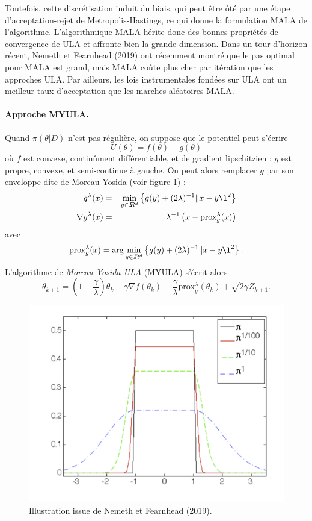 Toutefois, cette discrétisation induit du biais, qui peut être ôté par une étape d'acceptation-rejet de Metropolis-Hastings, ce qui donne la formulation MALA de l'algorithme. L'algorithmique MALA hérite donc des bonnes propriétés de convergence de ULA et affronte bien la grande dimension. Dans un tour d'horizon récent, Nemeth et Fearnhead (2019) ont récemment montré que le pas optimal pour MALA est grand, mais MALA coûte plus cher par itération que les approches ULA. Par ailleurs, les lois instrumentales fondées sur ULA ont un meilleur taux d'acceptation que les marches aléatoires MALA. \\

\paragraph{Approche MYULA.} Quand $\pi(\theta|D)$ n'est pas régulière, on suppose que le potentiel peut s'écrire
$$
U(\theta) = f(\theta) + g(\theta)
$$
où $f$ est convexe, continûment différentiable, et de gradient lipschitzien ; $g$ est propre, convexe, et semi-continue à gauche. On peut alors remplacer $g$ par son enveloppe dite de Moreau-Yosida (voir figure \ref{MY}) :
\begin{eqnarray*}
g^{\lambda}(x) & = & \min\limits_{y\in \R^d} \left\{ g(y) + (2\lambda)^{-1} \|x-y\l^2\right\} \\
\nabla g^{\lambda}(x) & = & \lambda^{-1} \left(x-\mbox{prox}^{\lambda}_g(x)\right)
\end{eqnarray*}
avec
$$
\mbox{prox}^{\lambda}_g(x) = \arg\min\limits_{y\in \R^d} \left\{ g(y) + (2\lambda)^{-1} \|x-y\l^2\right\}. 
$$
L'algorithme de \emph{Moreau-Yosida ULA} (MYULA) s'écrit alors
$$
\theta_{k+1} = \left(1-\frac{\gamma}{\lambda}\right)\theta_k - \gamma\nabla f(\theta_k) + \frac{\gamma}{\lambda}\mbox{prox}^{\lambda}_g(\theta_k) + \sqrt{2\gamma} Z_{k+1}.
$$

\begin{figure}[hbtp]
\centering
\includegraphics[scale=0.4]{figures/calcul/unif11.png} 
\caption{Illustration issue de Nemeth et Fearnhead (2019).}
\label{MY}
\end{figure}


